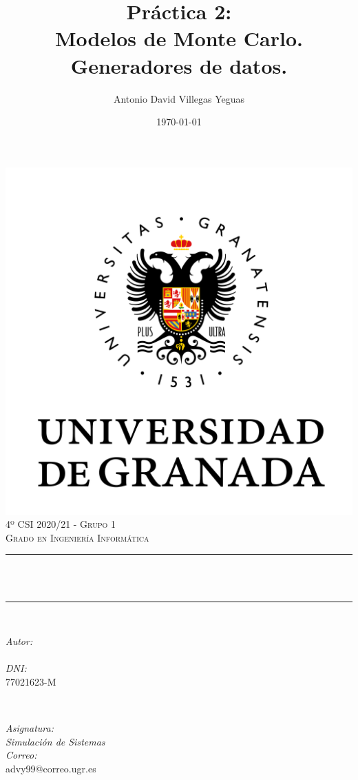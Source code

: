 \documentclass[12pt, spanish]{article}
\title{Práctica 2:\\
Modelos de Monte Carlo. Generadores de datos.\hspace{0.05cm} }
\author{Antonio David Villegas Yeguas}
\date{\today}
\makeatletter
\let\thetitle\@title
\let\theauthor\@author
\makeatother
\begin{document}

\begin{titlepage}
    \centering
    \vspace*{0.3 cm}
    \includegraphics[scale = 0.50]{ugr.png}\\[0.7 cm]
    \textsc{\large 4º CSI 2020/21 - Grupo 1}\\[0.5 cm]
    \textsc{\large Grado en Ingeniería Informática}\\[0.5 cm]
    \rule{\linewidth}{0.2 mm} \\[0.2 cm]
    { \huge \bfseries \thetitle}\\
    \rule{\linewidth}{0.2 mm} \\[1 cm]

    \begin{minipage}{0.4\textwidth}
        \begin{flushleft} \large
            \emph{Autor:}\\
            \theauthor\\
			 \emph{DNI:}\\
            77021623-M
            \end{flushleft}
            \end{minipage}~
            \begin{minipage}{0.4\textwidth}
            \begin{flushright} \large
            \emph{Asignatura: \\
            Simulación de Sistemas}   \\
            \emph{Correo:}\\
            advy99@correo.ugr.es
        \end{flushright}
    \end{minipage}\\[0.5cm]


\end{titlepage}
\end{document}
